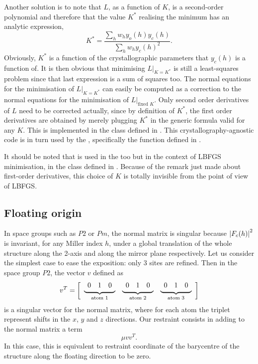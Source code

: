 \documentclass[12pt]{article}
\begin{document}
Another solution is to note that $L$, as a function of $K$, is a second-order polynomial and therefore that the value $K^*$ realising the minimum has an analytic expression,
\begin{equation}
K^* = \frac{\sum_h w_h y_o(h) y_c(h)}{\sum_h w_h y_c(h)^2}.
\label{eqn:optimalK}
\end{equation}
Obviously, $K^*$ is a function of the crystallographic parameters that $y_c(h)$ is a function of. It is then obvious that minimising $L|_{K=K^*}$ is still a least-squares problem since that last expression is a sum of squares too.  The normal equations for the minimisation of $L|_{K=K^*}$ can easily be computed as a correction to the normal equations for the minimisation of $L|_{\text{fixed $K$}}$. Only second order derivatives of $L$ need to be corrected actually, since by definition of $K^*$, the first order derivatives are obtained by merely plugging $K^*$ in the generic formula valid for any $K$. This is implemented in the \cpp class  defined in . This crystallography-agnostic code is in turn used by the \smtbx, specifically the function  defined in .

It should be noted that  is used in the \cctbx too but in the context of LBFGS minimisation, in the \cpp class  defined in . Because of the remark just made about first-order derivatives, this choice of $K$ is totally invisible from the point of view of LBFGS.

\subsection{Floating origin}

In space groups such as $P2$ or $Pm$, the normal matrix is singular because $\left| F_c(h) \right|^2$ is invariant, for any Miller index $h$, under a global translation of the whole structure along the 2-axis and along the mirror plane respectively. Let us consider the simplest case to ease the exposition: only 3 sites are refined. Then in the space group $P2$, the vector $v$ defined as
\newcommand{\tmp}[1]{\underbrace{\protect\begin{array}{ccc} 0&1&0 \end{array}}_{\text{atom #1}}}
\begin{equation}
v^T = \left[ \begin{array}{ccc} \tmp{1} & \tmp{2} & \tmp{3} \end{array} \right]
\end{equation}
is a singular vector for the normal matrix, where for each atom the triplet represent shifts in the $x$, $y$ and $z$ directions. Our restraint consists in adding to the normal matrix a term
\begin{equation}
\mu v v^T.
\end{equation}
In this case, this is equivalent to restraint coordinate of the barycentre of the structure along the floating direction to be zero.
\end{document}
